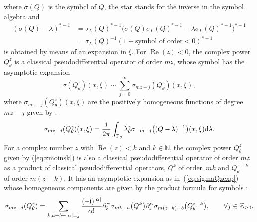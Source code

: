 \documentclass[pdftex]{sigma}
\numberwithin{equation}{section}
\theoremstyle{definition}
\newcommand{\Z}{\mathbb Z}
\newcommand{\N}{\mathbb N}
\begin{document}
where $\sigma(Q)$ is the symbol of $Q$, the star stands for the inverse in the symbol algebra and
\begin{align*}
(\sigma(Q)-\lambda)^{*-1}&{}= \sigma_L(Q)^{*-1} \bigl(\sigma(Q)\sigma_L(Q)^{*-1} -\lambda \sigma_L(Q)^{*-1} \bigr)^{*-1}\\
&{}=\sigma_L(Q)^{-1} (1+\text{symbol of order} <0)^{*-1}
\end{align*}
is obtained by means of an expansion in $\xi$.
For $\operatorname{Re}(z)<0$, the complex power $Q_\theta^z$ is a classical pseudodifferential operator of order $mz$, whose symbol has the asymptotic expansion
\begin{equation} \label{eq:sigmaQzexp}\sigma(Q_\theta^z)(x,\xi)\sim \sum_{j=0}^\infty\sigma_{mz-j}(Q_\theta^z)(x,\xi),\end{equation}
where $\sigma_{mz-j}(Q_\theta^z)(x,\xi)$ are the positively homogeneous functions of degree $mz-j$ given by {\cite[formula (4.8.2.7)]{Sc}:
\begin{equation}\label{eq:symbolqz}
\sigma_{mz-j}(Q_\theta^z)(x,\xi)=\frac{{\rm i}}{2\pi}\int_{\Gamma_\theta}\lambda_\theta^z\sigma_{-m-j}\bigl((Q-\lambda)^{-1}\bigr)(x,\xi) {\rm d}\lambda.
\end{equation}
For a complex number $z$ with $\operatorname{Re}(z)<k$ and $k\in \N$, the complex power $Q_\theta^z$ given by (\ref{eq:zmoinsk}) is also a classical pseudodifferential operator of order $mz$ as a product of classical pseudodifferential operators, $Q^k$ of order~$mk$ and $Q_\theta^{z-k}$ of order $m(z-k)$. It has an asymptotic expansion as in~(\ref{eq:sigmaQzexp}) whose homogeneous components are given by the product formula for symbols \cite[formula~(10.16)]{Sh}: \begin{equation}\label{sigmajzk}
\sigma_{mz-j}(Q_\theta^z)= \sum_{k,a+b+\vert \alpha\vert=j} \frac{(-{\rm i})^{\vert \alpha \vert}}{\alpha!} \partial_\xi^\alpha \sigma_{mk-a} \bigl(Q^k\bigr) \partial_x^\alpha\sigma_{m(z-k)-b}\bigl(Q_\theta^{z-k}\bigr),\qquad \forall j\in \Z_{\geq 0}. 	\end{equation} }
	
\end{document}
